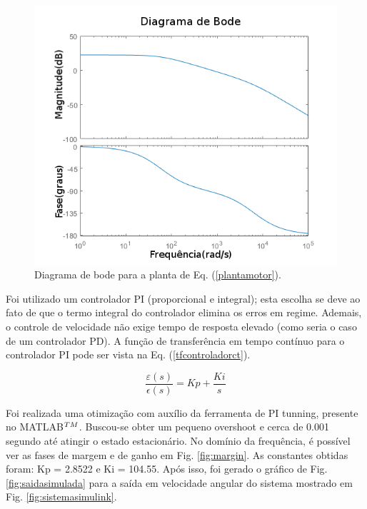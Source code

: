 \documentclass[10pt,fleqn,a4paper]{article}
\begin{document}
	\begin{figure}[ht]
		\begin{center}
			\includegraphics[angle=0, scale=0.7]{images/bode_review}
		\end{center}
		\caption{Diagrama de bode para a planta de Eq. (\ref{plantamotor}).}
		\label{fig:bode}
	\end{figure}
    
    Foi utilizado um controlador PI (proporcional e integral); esta escolha se deve ao fato de que o termo integral do controlador elimina os erros em regime. Ademais, o controle de velocidade não exige tempo de resposta elevado (como seria o caso de um controlador PD). A função de transferência em tempo contínuo para o controlador PI pode ser vista na Eq. (\ref{tfcontroladorct}).
    
    \begin{equation}
    \frac{\varepsilon(s)}{\epsilon(s)}= Kp + \frac{Ki}{s} \label{tfcontroladorct}
    \end{equation}
    
    Foi realizada uma otimização com auxílio da ferramenta de PI tunning, presente no MATLAB$^{\small{TM}}$. Buscou-se obter um pequeno overshoot e cerca de 0.001 segundo até atingir o estado estacionário. No domínio da frequência, é possível ver as fases de margem e de ganho em Fig. \ref{fig:margin}. As constantes obtidas foram: Kp = 2.8522 e Ki = 104.55. Após isso, foi gerado o gráfico de Fig. \ref{fig:saidasimulada} para a saída em velocidade angular do sistema mostrado em Fig.  \ref{fig:sistemasimulink}.
    
\end{document}

